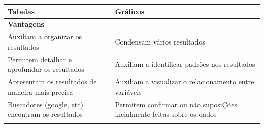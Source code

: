 \documentclass[
]{book}
\begin{document}
\begin{longtable}[]{@{}ll@{}}
\toprule
\begin{minipage}[b]{0.47\columnwidth}\raggedright
Tabelas\strut
\end{minipage} & \begin{minipage}[b]{0.47\columnwidth}\raggedright
Gráficos\strut
\end{minipage}\tabularnewline
\midrule
\endhead
\begin{minipage}[t]{0.47\columnwidth}\raggedright
\textbf{Vantagens}\strut
\end{minipage} & \begin{minipage}[t]{0.47\columnwidth}\raggedright
\strut
\end{minipage}\tabularnewline
\begin{minipage}[t]{0.47\columnwidth}\raggedright
Auxiliam a organizar os resultados\strut
\end{minipage} & \begin{minipage}[t]{0.47\columnwidth}\raggedright
Condensam vários resultados\strut
\end{minipage}\tabularnewline
\begin{minipage}[t]{0.47\columnwidth}\raggedright
Permitem detalhar e aprofundar os resultados\strut
\end{minipage} & \begin{minipage}[t]{0.47\columnwidth}\raggedright
Auxiliam a identificar padrões nos resultados\strut
\end{minipage}\tabularnewline
\begin{minipage}[t]{0.47\columnwidth}\raggedright
Apresentam os resultados de maneira mais precisa\strut
\end{minipage} & \begin{minipage}[t]{0.47\columnwidth}\raggedright
Auxiliam a visualizar o relacionamento entre variáveis\strut
\end{minipage}\tabularnewline
\begin{minipage}[t]{0.47\columnwidth}\raggedright
Buscadores (google, etc) encontram os resultados\strut
\end{minipage} & \begin{minipage}[t]{0.47\columnwidth}\raggedright
Permitem confirmar ou não suposiÇões incialmente feitas sobre os dados\strut
\end{minipage}\tabularnewline
\begin{minipage}[t]{0.47\columnwidth}\raggedright
\strut
\end{minipage} & \begin{minipage}[t]{0.47\columnwidth}\raggedright

\end{minipage}
\end{longtable}
\end{document}
